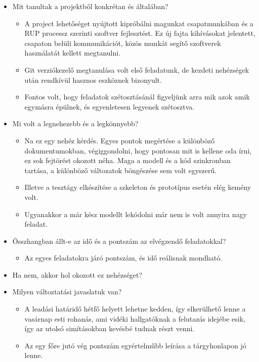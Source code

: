 \begin{itemize}
\item Mit tanultak a projektből konkrétan és általában? %
\begin{itemize}
\item A project lehetőséget nyújtott kipróbálni magunkat csapatmunkában és a RUP processz szerinti szoftver fejlesztést. Ez új fajta kihívásokat jelentett, csapaton belüli kommunikációt, közös munkát segítő szoftverek használatát kellett megtanulni. 
\item Git verziókezelő megtanulása volt első feladatunk, de kezdeti nehézségek után rendkívül hasznos eszköznek bizonyult.
\item Fontos volt, hogy feladatok szétosztásánál figyeljünk arra mik azok amik egymásra épülnek, és egyenletesen legyenek szétosztva.
\end{itemize}
\item Mi volt a legnehezebb és a legkönnyebb? %
\begin{itemize}
\item Na ez egy nehéz kérdés. Egyes pontok megértése a különböző dokumentumokban, végiggondolni, hogy pontosan mit is kellene oda írni, ez sok fejtörést okozott néha. Maga a modell és a kód szinkronban tartása, a különböző változatok böngészése sem volt egyszerű. 
\item Illetve a tesztágy elkészítése a szkeleton és prototípus esetén elég kemény volt. 
\item Ugyanakkor a már kész modellt lekódolni már nem is volt annyira nagy feladat.
\end{itemize}

\item Összhangban állt-e az idő és a pontszám az elvégzendő feladatokkal?%
\begin{itemize}
\item Az egyes feladatokra járó pontszám, és idő reálisnak mondható.
\end{itemize}
\item Ha nem, akkor hol okozott ez nehézséget? \newline
\item Milyen változtatási javaslatuk van? %
\begin{itemize}
\item A leadási határidő hétfő helyett lehetne kedden, így elkerülhető lenne a vasárnap esti rohanás, ami vidéki hallgatóknak a felutazás idejébe esik, így az utolsó simításokban kevésbé tudnak részt venni.
\item Az egy főre jutó vég pontszám egyértelműbb leírása a tárgyhonlapon jó lenne.
\end{itemize}


\end{itemize}
